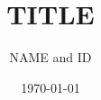 \documentclass[notitlepage]{report}
\title{TITLE}
\author{NAME and ID}
\date{\today}
\begin{document}
\maketitle
\thispagestyle{empty}

\begin{abstract}
\lipsum[1]
\end{abstract}
\end{document}
